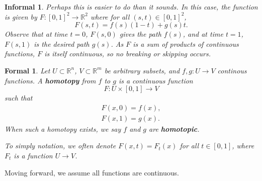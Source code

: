 \documentclass{amsart}
\newtheorem*{formal}{Formal}
\newtheorem*{informal}{Informal}
\begin{document}
\begin{definition}[Homotopy]
\begin{informal}
		Perhaps this is easier to do than it sounds. In this case, the function
		is given by \(F: [0,1]^2\to\mathbb{R}^2\) where for all \((s, t)\in[0,
		1]^2\), 
		\[
		   F(s, t) = f(s)(1-t) + g(s)t.
		\]
		Observe that at time \(t=0\), \(F(s, 0)\) gives the path \(f(s)\), and
		at time \(t=1\), \(F(s, 1)\) is the desired path \(g(s)\). As \(F\) is a
		sum of products of continuous functions, \(F\) is itself continuous, so
		no breaking or skipping occurs.
	\end{informal}
	\begin{formal}
	   Let \(U\subset \mathbb{R}^n\), \(V\subset\mathbb{R}^m\) be arbitrary
		subsets, and \(f, g: U\to V\) continous functions. A \textbf{homotopy}
		from \(f\) to \(g\) is a continuous function 
		\[
			F: U\times [0, 1]\to V
		\]
		such that 
		\begin{align*}
		   F(x, 0) = f(x),\\
			F(x, 1) = g(x).
		\end{align*}
		When such a homotopy exists, we say \(f\) and \(g\) are
		\textbf{homotopic}.

		To simply notation, we often denote \(F(x, t) = F_t(x)\) for all \(t\in
		[0, 1]\), where \(F_t\) is a function \(U\to V\).
	\end{formal}
\end{definition}

Moving forward, we assume all functions are continuous.
	
\end{document}
